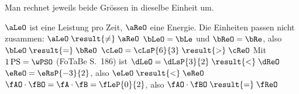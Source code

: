 Man rechnet jeweils beide Grössen in dieselbe Einheit um.
\begin{abcliste}
\abc $\aLeO$ ist eine Leistung pro Zeit, $\aReO$ eine Energie. Die Einheiten passen nicht zusammen: $\aLeO \;\result{\neq}\; \aReO$
\abc $\bLeO = \bLe$ und $\bReO = \bRe$, also $\bLeO \;\result{=}\; \bReO$
\abc $\cLeO = \cLsP{6}{3} \;\result{>}\; \cReO$
\abc Mit $1\,\mathrm{PS} = \wPSO$ (FoTaBe S.~186) ist $\dLeO = \dLsP{3}{2} \;\result{<}\; \dReO$
\abc $\eReO = \eRsP{-3}{2}$, also $\eLeO \;\result{<}\; \eReO$
\abc $\fAO\cdot\fBO = \fA\cdot\fB = \fLeP{0}{2}$, also $\fAO\cdot\fBO \;\result{=}\; \fReO$
\end{abcliste}
